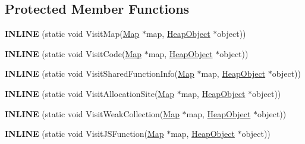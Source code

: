 \subsection*{Protected Member Functions}
\begin{DoxyCompactItemize}
\item 
{\bfseries I\+N\+L\+I\+NE} (static void Visit\+Map(\hyperlink{classv8_1_1internal_1_1_map}{Map} $\ast$map, \hyperlink{classv8_1_1internal_1_1_heap_object}{Heap\+Object} $\ast$object))\hypertarget{classv8_1_1internal_1_1_static_marking_visitor_aa41e4e985626e828b69bd75936047ce8}{}\label{classv8_1_1internal_1_1_static_marking_visitor_aa41e4e985626e828b69bd75936047ce8}

\item 
{\bfseries I\+N\+L\+I\+NE} (static void Visit\+Code(\hyperlink{classv8_1_1internal_1_1_map}{Map} $\ast$map, \hyperlink{classv8_1_1internal_1_1_heap_object}{Heap\+Object} $\ast$object))\hypertarget{classv8_1_1internal_1_1_static_marking_visitor_a6d12ae51982ce913727d3898bb22cc67}{}\label{classv8_1_1internal_1_1_static_marking_visitor_a6d12ae51982ce913727d3898bb22cc67}

\item 
{\bfseries I\+N\+L\+I\+NE} (static void Visit\+Shared\+Function\+Info(\hyperlink{classv8_1_1internal_1_1_map}{Map} $\ast$map, \hyperlink{classv8_1_1internal_1_1_heap_object}{Heap\+Object} $\ast$object))\hypertarget{classv8_1_1internal_1_1_static_marking_visitor_a90efc1d5dc60654ca699cf7f148090b6}{}\label{classv8_1_1internal_1_1_static_marking_visitor_a90efc1d5dc60654ca699cf7f148090b6}

\item 
{\bfseries I\+N\+L\+I\+NE} (static void Visit\+Allocation\+Site(\hyperlink{classv8_1_1internal_1_1_map}{Map} $\ast$map, \hyperlink{classv8_1_1internal_1_1_heap_object}{Heap\+Object} $\ast$object))\hypertarget{classv8_1_1internal_1_1_static_marking_visitor_ac79600db4849950478fe8e523d13c2be}{}\label{classv8_1_1internal_1_1_static_marking_visitor_ac79600db4849950478fe8e523d13c2be}

\item 
{\bfseries I\+N\+L\+I\+NE} (static void Visit\+Weak\+Collection(\hyperlink{classv8_1_1internal_1_1_map}{Map} $\ast$map, \hyperlink{classv8_1_1internal_1_1_heap_object}{Heap\+Object} $\ast$object))\hypertarget{classv8_1_1internal_1_1_static_marking_visitor_af0421ceb24652a0275276eedc865fd7e}{}\label{classv8_1_1internal_1_1_static_marking_visitor_af0421ceb24652a0275276eedc865fd7e}

\item 
{\bfseries I\+N\+L\+I\+NE} (static void Visit\+J\+S\+Function(\hyperlink{classv8_1_1internal_1_1_map}{Map} $\ast$map, \hyperlink{classv8_1_1internal_1_1_heap_object}{Heap\+Object} $\ast$object))\hypertarget{classv8_1_1internal_1_1_static_marking_visitor_a39761c4684c04a36fbe27d31912efe48}{}\label{classv8_1_1internal_1_1_static_marking_visitor_a39761c4684c04a36fbe27d31912efe48}


\end{DoxyCompactItemize}
